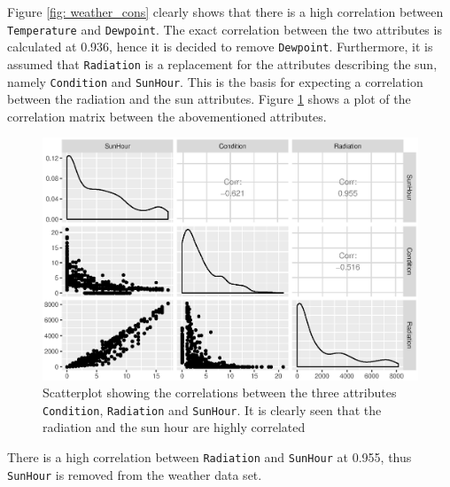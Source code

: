 \noindent Figure \ref{fig: weather_cons} clearly shows that there is a high correlation between \texttt{Temperature} and \texttt{Dewpoint}. The exact correlation between the two attributes is calculated at 0.936, hence it is decided to remove \texttt{Dewpoint}. Furthermore, it is assumed that \texttt{Radiation} is a replacement for the attributes describing the sun, namely \texttt{Condition} and \texttt{SunHour}. This is the basis for expecting a correlation between the radiation and the sun attributes. Figure \ref{fig: gg_cor} shows a plot of the correlation matrix between the abovementioned attributes.
\begin{figure}
    \centering
    \includegraphics[width=1.\textwidth]{../../../figures/gg_cor.eps}
    \caption{Scatterplot showing the correlations between the three attributes \texttt{Condition}, \texttt{Radiation} and \texttt{SunHour}. It is clearly seen that the radiation and the sun hour are highly correlated}
    \label{fig: gg_cor}
\end{figure}
\noindent There is a high correlation between \texttt{Radiation} and \texttt{SunHour} at 0.955, thus \texttt{SunHour} is removed from the weather data set. \\
 

